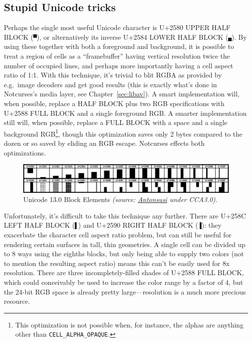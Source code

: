 \subsection{Stupid Unicode tricks}
Perhaps the single most useful Unicode character is U+2580 UPPER HALF BLOCK
(\texttt{▀}), or alternatively its inverse U+2584 LOWER HALF BLOCK
(\texttt{▄}). By using these together with both a foreground and background,
it is possible to treat a region of cells as a ``framebuffer'' having
vertical resolution twice the number of occupied lines, and perhaps more importantly
having a cell aspect ratio of 1:1. With this technique, it's trivial to blit
RGBA as provided by e.g.\ image decoders and get good results (this is exactly
what's done in Notcurses's media layer, see Chapter~\ref{sec:libav}). A smart
implementation will, when possible, replace a HALF BLOCK plus two RGB specifications
with U+2588 FULL BLOCK and a single foreground RGB. A smarter implementation
still will, when possible, replace a FULL BLOCK with a space and a single
background RGB\footnote{This optimization is not possible when, for instance,
the alphas are anything other than \texttt{CELL\_ALPHA\_OPAQUE}.}, though this
optimization saves only 2 bytes compared to the dozen or so saved by eliding
an RGB escape. Notcurses effects both optimizations.

\begin{figure}[!htb]
    \centering
    \includegraphics[width=.75\linewidth]{media/blockelements.png}
    \caption{Unicode 13.0 Block Elements \textit{(source: \href{https://commons.wikimedia.org/wiki/File:UCB_Block_Elements.png}{Antonsusi} under CCA3.0)}.}
    \label{fig:blockelements}
\end{figure}

Unfortunately, it's difficult to take this technique any further. There are
U+258C LEFT HALF BLOCK (\texttt{▌}) and U+2590 RIGHT HALF BLOCK (\texttt{▐}):
they exacerbate the character cell aspect ratio problem, but can still be
useful for rendering certain surfaces in tall, thin geometries. A single cell
can be divided up to 8 ways using the eighths blocks, but only being able to
supply two colors (not to mention the resulting aspect ratio) means this can't
be easily used for 8x resolution. There are three incompletely-filled shades of
U+2588 FULL BLOCK, which could conceivably be used to increase the color range
by a factor of 4, but the 24-bit RGB space is already pretty large---resolution
is a much more precious resource.

